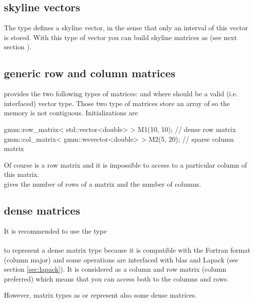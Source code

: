 \documentclass[11pt,a4paper]{article}
\begin{document}
\subsection{skyline vectors}
The type  defines a skyline vector, in the sense that only an interval of this vector is stored. With this type of vector you can build skyline matrices as  (see next section \label{sec:racmat}).

\subsection{generic row and column matrices} \label{sec:racmat}
\gmm provides the two following types of matrices:  and  where  should be a valid (i.e. interfaced) vector type.
Those two type of matrices store an array of  so the memory is not contiguous. Initializations are
\begin{cppcode}
  gmm::row_matrix< std::vector<double> > M1(10, 10);  // dense row matrix
  gmm::col_matrix< gmm::wsvector<double> > M2(5, 20); // sparse column matrix
\end{cppcode}
Of course  is a row matrix and it is impossible to access to a particular column of this matrix. 
\\

 gives the number of rows of a matrix and  the number of columns.

\subsection{dense matrices}
It is recommended to use the type \\[0.2cm]
  \\[0.2cm]
to represent a dense matrix type because it is compatible with the Fortran format (column major) and some operations are interfaced with blas and Lapack (see section \ref{sec:lapack}). It is considered as a column and row matrix (column preferred) which means that you can access both to the columns and rows.

However, matrix types as  or  represent also some dense matrices.
\end{document}
